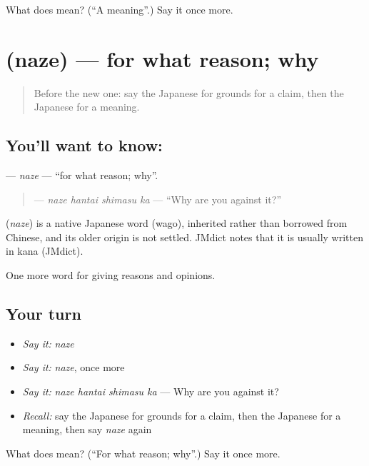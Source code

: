 \begin{tcolorbox}[breakable,colback=teal!4,colframe=teal!35!black,title={Before you move on}]
What does  mean? (\textquotedblleft{}A meaning\textquotedblright{}.) Say it once more.
\end{tcolorbox}
\section[\texorpdfstring{\ja{なぜ} (naze)}{なぜ (naze)}]{ (naze) — for what reason; why}

\label{lesson:JA-C318-naze}



\begin{quote}
Before the new one: say the Japanese for grounds for a claim, then the Japanese for a meaning.
\end{quote}

\subsection*{You'll want to know: }
\textbf{} — \emph{naze} — \textquotedblleft{}for what reason; why\textquotedblright{}.

\begin{quote}
\textbf{ } — \emph{naze hantai shimasu ka} — \textquotedblleft{}Why are you against it?\textquotedblright{}
\end{quote}

\begin{cousinweb}
\textbf{} (\emph{naze}) is a native Japanese word (wago), inherited rather than borrowed from Chinese, and its older origin is not settled. JMdict notes that it is usually written in kana (JMdict).
\end{cousinweb}

\begin{grammarlens}[title={What you've built}]
One more word for giving reasons and opinions.
\end{grammarlens}

\subsection*{Your turn}
\begin{itemize}
\raggedright
  \item \emph{Say it:} \emph{naze}
  \item \emph{Say it:} \emph{naze}, once more
  \item \emph{Say it:} \emph{naze hantai shimasu ka} — Why are you against it?
  \item \emph{Recall:} say the Japanese for grounds for a claim, then the Japanese for a meaning, then say \emph{naze} again
\end{itemize}

\begin{tcolorbox}[breakable,colback=teal!4,colframe=teal!35!black,title={Before you move on}]
What does  mean? (\textquotedblleft{}For what reason; why\textquotedblright{}.) Say it once more.
\end{tcolorbox}
